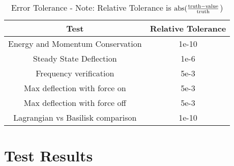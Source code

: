\begin{table}[htbp]
	\caption{Error Tolerance - Note: Relative Tolerance is $\textnormal{abs}(\frac{\textnormal{truth} - \textnormal{value}}{\textnormal{truth}}$)}
	\label{tab:errortol}
	\centering \fontsize{10}{10}\selectfont
	\begin{tabular}{| c | c |} %
		\hline
		Test   & Relative Tolerance \\
		\hline
		Energy and Momentum Conservation & 1e-10 \\
		\hline
		Steady State Deflection & 1e-6 \\
		\hline
		Frequency verification & 5e-3 \\
		\hline
		Max deflection with force on & 5e-3 \\
		\hline
		Max deflection with force off & 5e-3 \\
		\hline
		Lagrangian vs Basilisk comparison & 1e-10 \\
		\hline	
	\end{tabular}
\end{table}

\clearpage

\section{Test Results}

\clearpage
